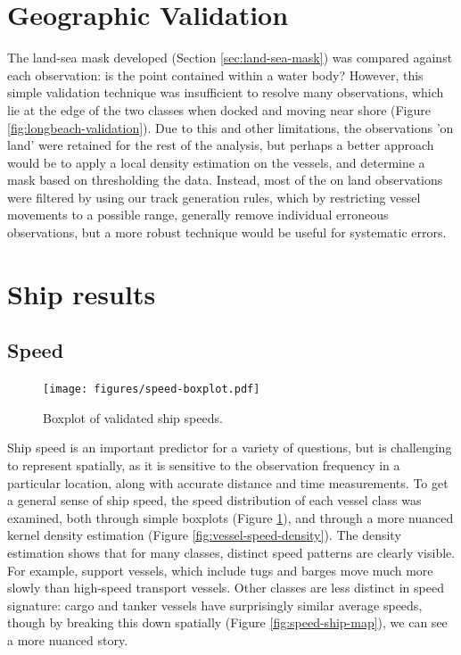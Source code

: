 \section{Geographic Validation}

The land-sea mask developed (Section \ref{sec:land-sea-mask}) was compared against each observation: is the point contained within a water body? However, this simple validation technique was insufficient to resolve many observations, which lie at the edge of the two classes when docked %
 and moving near shore %
(Figure \ref{fig:longbeach-validation}). Due to this and other limitations, the observations 'on land' were retained for the rest of the analysis, but perhaps a better approach would be to apply a local density estimation on the vessels, and determine a mask based on thresholding the data. Instead, most of the on land observations were filtered by using our track generation rules, which by restricting vessel movements to a possible range, generally remove individual erroneous observations, but a more robust technique would be useful for systematic errors.


\section{Ship results}

\subsection{Speed}
\begin{figure}[htbp]
  \centering
  \texttt{[image: figures/speed-boxplot.pdf]}
  \caption{Boxplot of validated ship speeds.}
  \label{fig:vessel-speed-boxplot} %
\end{figure}

Ship speed is an important predictor for a variety of questions, but is challenging to represent spatially, as it is sensitive to the observation frequency in a particular location, along with accurate distance and time measurements. To get a general sense of ship speed, the speed distribution of each vessel class was examined, both through simple boxplots (Figure \ref{fig:vessel-speed-boxplot}), and through a more nuanced kernel density estimation (Figure \ref{fig:vessel-speed-density}). The density estimation shows that for many classes, distinct speed patterns are clearly visible. For example, support vessels, which include tugs and barges move much more slowly than high-speed transport vessels. Other classes are less distinct in speed signature: cargo and tanker vessels have surprisingly similar average speeds, though by breaking this down spatially (Figure \ref{fig:speed-ship-map}), we can see a more nuanced story.

